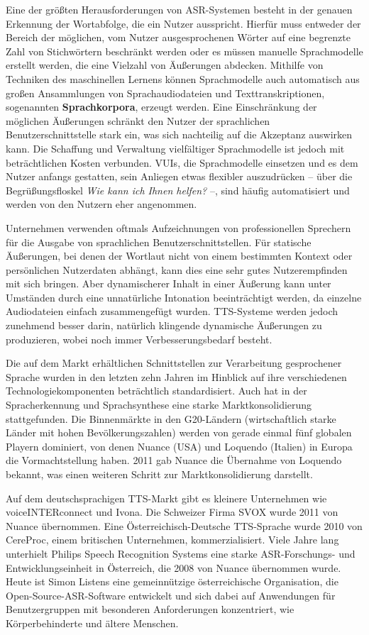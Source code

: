 \documentclass[]{../../metanetpaper}
\begin{document}
\begin{multicols}{2}
Eine der größten Herausforderungen von ASR-Syste\-men besteht in der genauen Erkennung der Wortabfolge, die ein Nutzer ausspricht. Hierfür muss entweder der Bereich der möglichen, vom Nutzer ausgesprochenen Wörter auf eine begrenzte Zahl von Stichwörtern beschränkt werden oder es müssen manuelle  Sprachmodelle erstellt werden, die eine Vielzahl von Äußerungen abdecken. Mithilfe von Techniken des maschinellen Lernens können Sprachmodelle auch automatisch aus großen Ansammlungen von Sprachaudiodateien und Texttranskriptionen, sogenannten \textbf{Sprachkorpora}, erzeugt werden. Eine Einschränkung der möglichen Äußerungen schränkt den Nutzer der sprachlichen Benutzerschnittstelle stark ein, was sich nachteilig auf die Akzeptanz auswirken kann. Die Schaffung und Verwaltung vielfältiger Sprachmodelle ist jedoch mit beträchtlichen Kosten verbunden. VUIs, die Sprachmodelle einsetzen und es dem Nutzer anfangs gestatten, sein Anliegen etwas flexibler auszudrücken -- über die Begrüßungsfloskel \textit{Wie kann ich Ihnen helfen?} --, sind häufig automatisiert und werden von den Nutzern eher angenommen. 

Unternehmen verwenden oftmals Aufzeichnungen von professionellen Sprechern für die Ausgabe von sprachlichen Benutzerschnittstellen. Für statische Äußerungen, bei denen der Wortlaut nicht von einem bestimmten Kontext oder persönlichen Nutzerdaten abhängt, kann dies eine sehr gutes Nutzerempfinden mit sich bringen. Aber dynamischerer Inhalt in einer Äußerung kann unter Umständen durch eine unnatürliche Intonation beeinträchtigt werden, da einzelne Audiodateien einfach zusammengefügt wurden. TTS-Systeme werden jedoch zunehmend besser darin, natürlich klingende dynamische Äußerungen zu produzieren, wobei noch immer Verbesserungsbedarf besteht. 

Die auf dem Markt erhältlichen Schnittstellen zur Verarbeitung gesprochener Sprache wurden in den letzten zehn Jahren im Hinblick auf ihre verschiedenen Technologiekomponenten beträchtlich standardisiert. Auch hat in der Spracherkennung und Sprachsynthese eine starke Marktkonsolidierung stattgefunden. Die Binnenmärkte in den G20-Ländern (wirtschaftlich starke Länder mit hohen Bevölkerungszahlen) werden von gerade einmal fünf globalen Playern dominiert, von denen Nuance (USA) und Loquendo (Italien) in Europa die Vormachtstellung haben. 2011 gab Nuance die Übernahme von Loquendo bekannt, was einen weiteren Schritt zur Marktkonsolidierung darstellt.

Auf dem deutschsprachigen TTS-Markt gibt es kleinere Unternehmen wie voiceINTERconnect und Ivona. Die Schweizer Firma SVOX wurde 2011 von Nuance übernommen. Eine Österreichisch-Deutsche TTS-Sprache wurde 2010 von CereProc, einem britischen Unternehmen, kommerzialisiert. Viele Jahre lang unterhielt Philips Speech Recognition Systems eine starke ASR-Forschungs- und Entwicklungseinheit in Österreich, die 2008 von Nuance übernommen wurde. Heute ist Simon Listens eine gemeinnützige österreichische Organisation, die Open-Source-ASR-Software entwickelt und sich dabei auf Anwendungen für Benutzergruppen mit besonderen Anforderungen konzentriert, wie Körperbehinderte und ältere Menschen.


\end{multicols}
\end{document}
